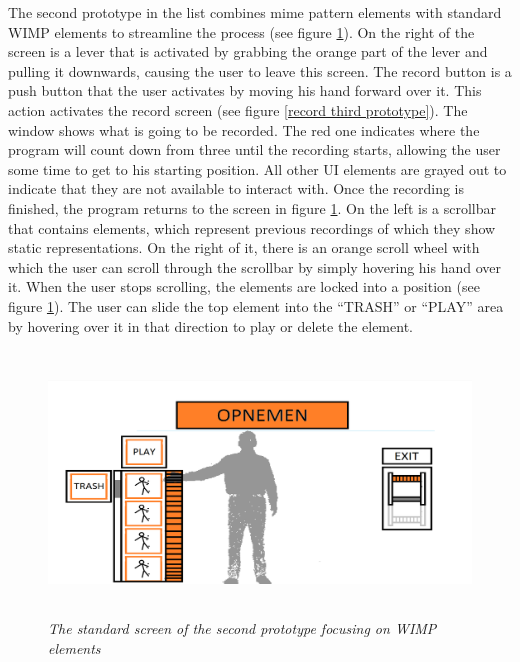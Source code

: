 The second prototype in the list combines mime pattern elements with standard WIMP elements to streamline the process (see figure \ref{standard third prototype}). On the right of the screen is a lever that is activated by grabbing the orange part of the lever and pulling it downwards, causing the user to leave this screen. The record button is a push button that the user activates by moving his hand forward over it. This action activates the record screen (see figure \ref{record third prototype}). The window shows what is going to be recorded. The red one indicates where the program will count down from three until the recording starts, allowing the user some time to get to his starting position. All other UI elements are grayed out to indicate that they are not available to interact with. Once the recording is finished, the program returns to the screen in figure \ref{standard third prototype}. On the left is a scrollbar that contains elements, which represent previous recordings of which they show static representations. On the right of it, there is an orange scroll wheel with which the user can scroll through the scrollbar by simply hovering his hand over it. When the user stops scrolling, the elements are locked into a position (see figure \ref{standard third prototype}). The user can slide the top element into the ``TRASH'' or ``PLAY'' area by hovering over it in that direction to play or delete the element.\\

\begin{figure}[H]
	\begin{center}
		\includegraphics[width=12.5cm, height=7cm]{figures/prototype_5_3_standard.png}
		\caption{\emph{The standard screen of the second prototype focusing on WIMP elements}}
		\label{standard third prototype}
	\end{center}
\end{figure}

